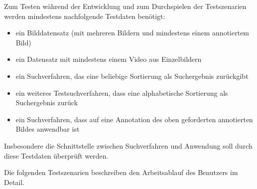 Zum Testen während der Entwicklung und zum Durchspielen der Testszenarien werden mindestens nachfolgende Testdaten benötigt:
\begin{itemize}
	\item ein Bilddatensatz (mit mehreren Bildern und mindestens einem annotiertem Bild)
	\item ein Datensatz mit mindestens einem Video aus Einzelbildern
	\item ein Suchverfahren, das eine beliebige Sortierung als Suchergebnis zurückgibt
	\item ein weiteres Testsuchverfahren, dass eine alphabetische Sortierung als Suchergebnis zurück %
	\item ein Suchverfahren, dass auf eine Annotation des oben geforderten annotierten Bildes anwendbar ist
\end{itemize}
Insbesondere die Schnittstelle zwischen Suchverfahren und Anwendung soll durch diese Testdaten überprüft werden.

Die folgenden Testszenarien beschreiben den Arbeitsablauf des Benutzers im Detail.

